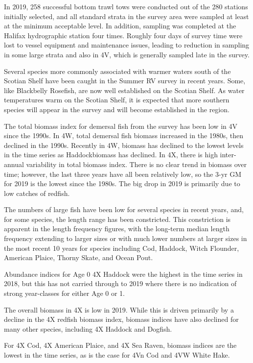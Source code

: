 \documentclass[11pt]{book}
\begin{document}
In 2019, 258 successful bottom trawl tows were conducted out of the 280 stations initially selected, and all standard strata in the survey area were sampled at least at the minimum acceptable level. In addition, sampling was completed at the Halifax hydrographic station four times. Roughly four days of survey time were lost to vessel equipment and maintenance issues, leading to reduction in sampling in some large strata and also in 4V, which is generally sampled late in the survey.

Several species more commonly associated with warmer waters south of the Scotian Shelf have been caught in the Summer RV survey in recent years. Some, like Blackbelly Rosefish, are now well established on the Scotian Shelf. As water temperatures warm on the Scotian Shelf, it is expected that more southern species will appear in the survey and will become established in the region.

The total biomass index for demersal fish from the survey has been low in 4V since the 1990s. In 4W, total demersal fish biomass increased in the 1980s, then declined in the 1990s. Recently in 4W, biomass has declined to the lowest levels in the time series as Haddockbiomass has declined. In 4X, there is high inter-annual variability in total biomass index. There is no clear trend in biomass over time; however, the last three years have all been relatively low, so the 3-yr GM for 2019 is the lowest since the 1980s. The big drop in 2019 is primarily due to low catches of redfish.

The numbers of large fish have been low for several species in recent years, and, for some species, the length range has been constricted. This constriction is apparent in the length frequency figures, with the long-term median length frequency extending to larger sizes or with much lower numbers at larger sizes in the most recent 10 years for species including Cod, Haddock, Witch Flounder, American Plaice, Thorny Skate, and Ocean Pout.

Abundance indices for Age 0 4X Haddock were the highest in the time series in 2018, but this has not carried through to 2019 where there is no indication of strong year-classes for either Age 0 or 1.

The overall biomass in 4X is low in 2019. While this is driven primarily by a decline in the 4X redfish biomass index, biomass indices have also declined for many other species, including 4X Haddock and Dogfish.

For 4X Cod, 4X American Plaice, and 4X Sea Raven, biomass indices are the lowest in the time series, as is the case for 4Vn Cod and 4VW White Hake.
\end{document}
